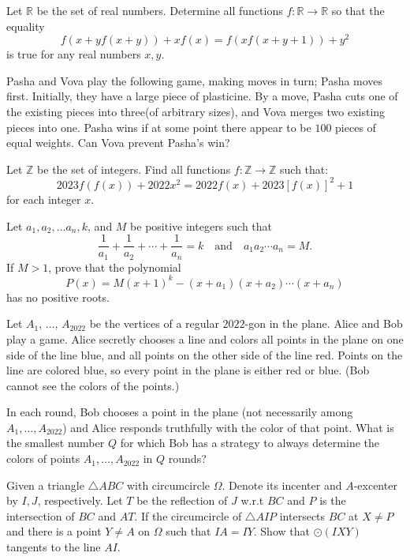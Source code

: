\documentclass[11pt]{scrartcl}
\begin{document}
\begin{problem}[827629029640194]
Let $\mathbb{R}$ be the set of real numbers. Determine all functions $f: \mathbb{R}\longrightarrow \mathbb{R}$ so that the equality$$f(x+yf(x+y)) +xf(x)= f(xf(x+y+1))+y^2$$is true for any real numbers $x,y$.
\end{problem}
\begin{problem}[829271701496996]
Pasha and Vova play the following game, making moves in turn; Pasha moves first. Initially, they have a large piece of plasticine. By a move, Pasha cuts one of the existing pieces into three(of arbitrary sizes), and Vova merges two existing pieces into one. Pasha wins if at some point there appear to be $100$ pieces of equal weights. Can Vova prevent Pasha's win?
\end{problem}
\begin{problem}[834743022162424]
Let $\mathbb{Z}$ be the set of integers. Find all functions $f:\mathbb{Z}\rightarrow\mathbb{Z}$ such that:
$$2023f(f(x))+2022x^2=2022f(x)+2023[f(x)]^2+1$$for each integer $x$.
\end{problem}
\begin{problem}[835565816078264]
Let $a_1,a_2,\ldots a_n,k$, and $M$ be positive integers such that
$$\frac{1}{a_1}+\frac{1}{a_2}+\cdots+\frac{1}{a_n}=k\quad\text{and}\quad a_1a_2\cdots a_n=M.$$If $M>1$, prove that the polynomial
$$P(x)=M(x+1)^k-(x+a_1)(x+a_2)\cdots (x+a_n)$$has no positive roots.
\end{problem}
\begin{problem}[836212333854709]
	Let $A_1$, $\ldots$, $A_{2022}$ be the vertices of a regular $2022$-gon in the plane. Alice and Bob play a game. Alice secretly chooses a line and colors all points in the plane on one side of the line blue, and all points on the other side of the line red. Points on the line are colored blue, so every point in the plane is either red or blue. (Bob cannot see the colors of the points.)

In each round, Bob chooses a point in the plane (not necessarily among $A_1, \ldots, A_{2022}$) and Alice responds truthfully with the color of that point. What is the smallest number $Q$ for which Bob has a strategy to always determine the colors of points $A_1, \ldots, A_{2022}$ in $Q$ rounds?
\end{problem}
\begin{problem}[836909183133087]
Given a triangle $ \triangle{ABC} $ with circumcircle $ \Omega $. Denote its incenter and $ A $-excenter by $ I, J $, respectively. Let $ T $ be the reflection of $ J $ w.r.t $ BC $ and $ P $ is the intersection of $ BC $ and $ AT $. If the circumcircle of $ \triangle{AIP} $ intersects $ BC $ at $ X \neq P $ and there is a point $ Y \neq A $ on $ \Omega $ such that $ IA = IY $. Show that $ \odot\left(IXY\right) $ tangents to the line $ AI $.
\end{problem}
\end{document}
